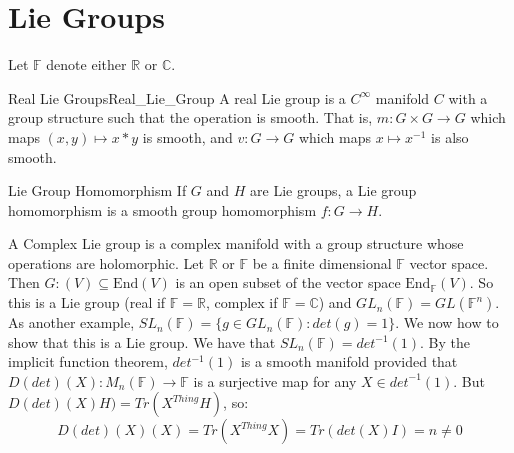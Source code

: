 \documentclass[crop=false,class=article]{standalone}                           %
\begin{document}
    \section{Lie Groups}
        Let $\mathbb{F}$ denote either $\mathbb{R}$ or $\mathbb{C}$.
        \begin{ldefinition}{Real Lie Groups}{Real_Lie_Group}
            A real Lie group is a $C^{\infty}$ manifold $C$ with a group
            structure such that the operation is smooth. That is,
            $m:G\times{G}\rightarrow{G}$ which maps $(x,y)\mapsto{x}*y$ is
            smooth, and $v:G\rightarrow{G}$ which maps
            $x\mapsto{x}^{\minus{1}}$ is also smooth.
        \end{ldefinition}
        \begin{ldefinition}{Lie Group Homomorphism}{}
            If $G$ and $H$ are Lie groups, a Lie group homomorphism is a
            smooth group homomorphism $f:G\rightarrow{H}$.
        \end{ldefinition}
        \begin{example}
            A Complex Lie group is a complex manifold with a group structure
            whose operations are holomorphic. Let $\mathbb{R}$ or
            $\mathbb{F}$ be a finite dimensional $\mathbb{F}$ vector space.
            Then $G:(V)\subseteq\textrm{End}(V)$ is an open subset of
            the vector space $\textrm{End}_{\mathbb{F}}(V)$. So this is
            a Lie group (real if $\mathbb{F}=\mathbb{R}$, complex if
            $\mathbb{F}=\mathbb{C}$) and
            $GL_{n}(\mathbb{F})=GL(\mathbb{F}^{n})$. As another example,
            $SL_{n}(\mathbb{F})=\{g\in{GL}_{n}(\mathbb{F}):det(g)=1\}$.
            We now how to show that this is a Lie group. We have that
            $SL_{n}(\mathbb{F})=det^{\minus{1}}(1)$. By the implicit
            function theorem, $det^{\minus{1}}(1)$ is a smooth
            manifold provided that
            $D(det)(X):M_{n}(\mathbb{F})\rightarrow\mathbb{F}$ is a
            surjective map for any $X\in{det}^{\minus{1}}(1)$. But
            $D(det)(X)H)=Tr(X^{Thing}H)$, so:
            \begin{equation}
                D(det)(X)(X)=Tr(X^{Thing}X)=Tr(det(X)I)=n\ne{0}
            \end{equation}
        \end{example}
\end{document}
